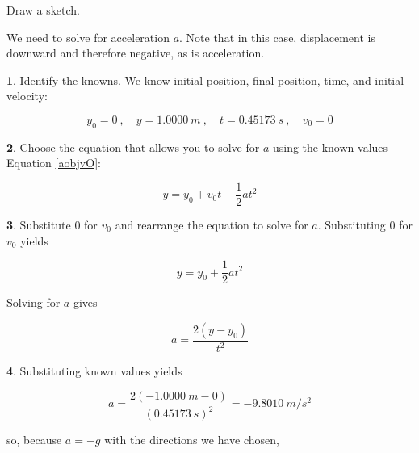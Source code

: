 \documentclass[../../main-ap-physics.tex]{subfiles}
\begin{document}
\Solution Draw a sketch.

\begin{center}
\end{center}

We need to solve for acceleration $a$. Note that in this case, displacement is downward and therefore negative, as is acceleration.

\vspace{1em}

\textbf{1}. Identify the knowns. We know initial position, final position, time, and initial velocity:

\begin{equation*}
    y_0 = 0\ , \quad
    y = \SI{1.0000}{m}\ , \quad
    t = \SI{0.45173}{s}\ , \quad
    v_0 = 0
\end{equation*}

\textbf{2}. Choose the equation that allows you to solve for $a$ using the known values---Equation \eqref{aobjvO}:

\begin{equation*}
    y = y_0 + v_0 t + \frac{1}{2} a t^2 
\end{equation*}

\textbf{3}. Substitute 0 for $v_0$ and rearrange the equation to solve for $a$. Substituting 0 for $v_0$ yields

\begin{equation*}
    y = y_0 + \frac{1}{2} a t^2
\end{equation*}

Solving for $a$ gives 

\begin{equation*}
    a = \frac{2 \left(y - y_0\right)}{t^2}
\end{equation*}

\textbf{4}. Substituting known values yields

\begin{equation*}
    a = \frac{2 \left(-\SI{1.0000}{m} - 0\right)}{\left(\SI[group-separator=\,]{0.45173}{s}\right)^2} = -\SI{9.8010}{m/s^2}
\end{equation*}

so, because $a = -g$ with the directions we have chosen,
\end{document}
